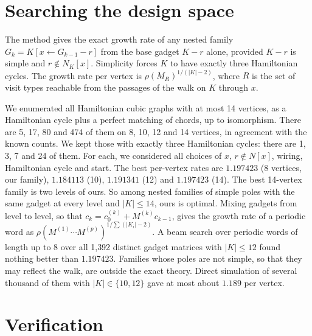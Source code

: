 \documentclass[11pt]{article}
\theoremstyle{definition}
\begin{document}
\section{Searching the design space}\label{sec:search}

The method gives the exact growth rate of any nested family
$G_k = K[x \leftarrow G_{k-1} - r]$ from the base gadget $K - r$ alone, provided $K - r$ is simple
and $r \notin N_K[x]$. Simplicity forces $K$ to have exactly three Hamiltonian cycles. The growth
rate per vertex is $\rho(M_R)^{1/(|K|-2)}$, where $R$ is the set of visit types reachable from the
passages of the walk on $K$ through $x$.

We enumerated all Hamiltonian cubic graphs with at most 14 vertices, as a Hamiltonian cycle plus a
perfect matching of chords, up to isomorphism. There are 5, 17, 80 and 474 of them on 8, 10, 12
and 14 vertices, in agreement with the known counts. We kept those with exactly three Hamiltonian
cycles: there are 1, 3, 7 and 24 of them. For each, we considered
all choices of $x$, $r \notin N[x]$, wiring, Hamiltonian cycle and start. The best per-vertex rates
are $1.197423$ (8 vertices, our family), $1.184113$ (10), $1.191341$ (12) and $1.197423$ (14). The
best 14-vertex family is two levels of ours. So among nested families of simple poles with the
same gadget at every level and $|K| \le 14$, ours is optimal. Mixing gadgets from level to level, so that $c_k =
c_0^{(k)} + M^{(k)} c_{k-1}$, gives the growth rate of a periodic word as
$\rho(M^{(1)} \cdots M^{(p)})^{1/\sum (|K_i|-2)}$. A beam search over periodic words of length up to
8 over all 1{,}392 distinct gadget matrices with $|K| \le 12$ found nothing better than
$1.197423$. Families whose poles are not simple, so that they may reflect the walk, are outside the
exact theory. Direct simulation of several thousand of them with $|K| \in \{10, 12\}$ gave at most
about $1.189$ per vertex.

\section{Verification}\label{sec:verification}
\end{document}
